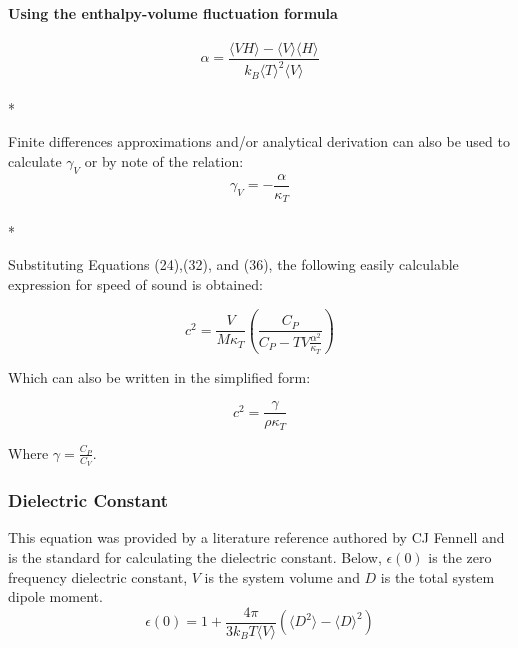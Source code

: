 \documentclass[aps,pre,twocolumn,nofootinbib,superscriptaddress,linenumbers,10pt, draft,tightenlines]{revtex4-1}
\begin{document}
\paragraph{Using the enthalpy-volume fluctuation formula}
\begin{equation}\alpha = \frac{\langle VH \rangle - \langle V \rangle \langle H \rangle}{k_B \langle T \rangle^2 \langle V \rangle}\end{equation}\\*

Finite differences approximations and/or analytical derivation can also be used to calculate $\gamma_V$ or by note of the relation:
\begin{equation}\gamma_V = - \frac{\alpha}{\kappa_T}\end{equation}\\*

Substituting Equations (24),(32), and (36), the following easily calculable expression for speed of sound is obtained:

\begin{equation} c^2=\frac{V}{M \kappa_T}\left(\frac{C_P}{C_P -TV\frac{\alpha^2}{\kappa_T}}\right)\end{equation}

Which can also be written in the simplified form:

\begin{equation} c^2= \frac{\gamma}{\rho \kappa_T} \end{equation}

Where $ \gamma=\frac{C_P}{C_V} $.


\subsubsection{Dielectric Constant}
This equation was provided by a literature reference authored by CJ Fennell\cite{dielec} and is the standard for calculating the dielectric constant. Below, $\epsilon(0)$ is the zero frequency dielectric constant, $V$ is the system volume and $D$ is the total system dipole moment. 
\begin{equation} \epsilon(0) = 1 + \frac{4 \pi}{3 k_B T \langle V \rangle}(\langle D^2 \rangle - \langle D \rangle^2) \end{equation}
\end{document}
